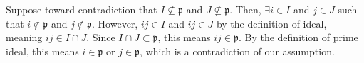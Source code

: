 \documentclass[8pt]{extarticle}
\begin{document}
  Suppose toward contradiction that $I\nsubseteq \mathfrak{p}$ and $J\nsubseteq \mathfrak{p}$. Then, $\exists i\in I$ and $j\in J$ such that $i\notin \mathfrak{p}$ and $j\notin \mathfrak{p}$. However, $ij\in I$ and $ij\in J$ by the definition of ideal, meaning $ij\in I\cap J$. Since $I\cap J \subset \mathfrak{p}$, this means $ij\in \mathfrak{p}$. By the definition of prime ideal, this means $i\in \mathfrak{p}$ or $j\in \mathfrak{p}$, which is a contradiction of our assumption.
\end{document}
